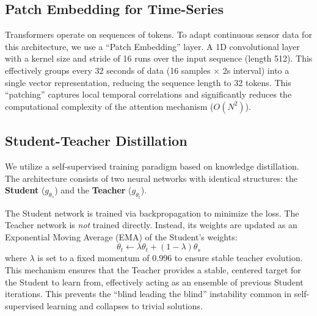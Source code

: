 \documentclass[conference]{IEEEtran}
\begin{document}
    

    

    \subsection{Patch Embedding for Time-Series}
    Transformers operate on sequences of tokens. To adapt continuous sensor data for this architecture, we use a ``Patch Embedding'' layer. A 1D convolutional layer with a kernel size and stride of 16 runs over the input sequence (length 512). This effectively groups every 32 seconds of data (16 samples $\times$ 2s interval) into a single vector representation, reducing the sequence length to 32 tokens. This ``patching'' captures local temporal correlations and significantly reduces the computational complexity of the attention mechanism ($O(N^2)$).

    \subsection{Student-Teacher Distillation}
    We utilize a self-supervised training paradigm based on knowledge distillation. The architecture consists of two neural networks with identical structures: the \textbf{Student} ($g_{\theta_s}$) and the \textbf{Teacher} ($g_{\theta_t}$).

    The Student network is trained via backpropagation to minimize the loss. The Teacher network is \textit{not} trained directly. Instead, its weights are updated as an Exponential Moving Average (EMA) of the Student's weights:
    \begin{equation}
        \theta_t \leftarrow \lambda \theta_t + (1 - \lambda) \theta_s
    \end{equation}
    where $\lambda$ is set to a fixed momentum of 0.996 to ensure stable teacher evolution. This mechanism ensures that the Teacher provides a stable, centered target for the Student to learn from, effectively acting as an ensemble of previous Student iterations. This prevents the ``blind leading the blind'' instability common in self-supervised learning and collapses to trivial solutions.
\end{document}
